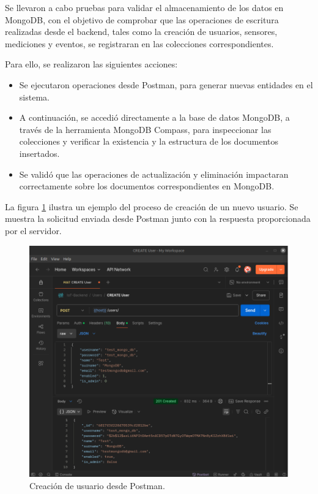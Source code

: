 Se llevaron a cabo pruebas para validar el almacenamiento de los datos en
MongoDB, con el objetivo de comprobar que las operaciones de escritura
realizadas desde el backend, tales como la creación de usuarios, sensores,
mediciones y eventos, se registraran en las colecciones correspondientes.

Para ello, se realizaron las siguientes acciones:

\begin{itemize}
    \item Se ejecutaron operaciones desde Postman, para generar nuevas entidades en el
          sistema.
    \item A continuación, se accedió directamente a la base de datos MongoDB, a través de
          la herramienta MongoDB Compass, para inspeccionar las colecciones y verificar
          la existencia y la estructura de los documentos insertados.
    \item Se validó que las operaciones de actualización y eliminación impactaran
          correctamente sobre los documentos correspondientes en MongoDB.
\end{itemize}

La figura \ref{fig:mongodb_1} ilustra un ejemplo del proceso de creación de un
nuevo usuario. Se muestra la solicitud enviada desde Postman junto con la
respuesta proporcionada por el servidor.

\begin{figure}[H]
    \centering
    \includegraphics[width=\textwidth]{Images/40_test_mongodb_1.png}
    \caption[Creación de usuario y validación en MongoDB]{Creación de usuario desde Postman.}
    \label{fig:mongodb_1}
\end{figure}

